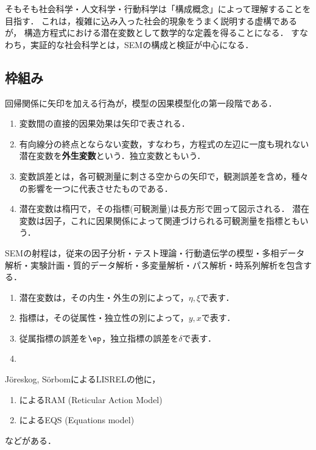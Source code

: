 \documentclass[uplatex,dvipdfmx]{jsreport}
\begin{document}
\begin{remarks}[抽象概念に数理的な定義を与える枠組みとしてのSEM]
    そもそも社会科学・人文科学・行動科学は「構成概念」によって理解することを目指す．
    これは，複雑に込み入った社会的現象をうまく説明する虚構であるが，
    構造方程式における潜在変数として数学的な定義を得ることになる．
    すなわち，実証的な社会科学とは，SEMの構成と検証が中心になる．
\end{remarks}

\subsection{枠組み}

\begin{definition}
    回帰関係に矢印を加える行為が，模型の因果模型化の第一段階である．
    \begin{enumerate}
        \item 変数間の直接的因果効果は矢印で表される．
        \item 有向線分の終点とならない変数，すなわち，方程式の左辺に一度も現れない潜在変数を\textbf{外生変数}という．独立変数ともいう．
        \item 変数誤差とは，各可観測量に刺さる空からの矢印で，観測誤差を含め，種々の影響を一つに代表させたものである．
        \item 潜在変数は楕円で，その指標(可観測量)は長方形で囲って図示される．
        潜在変数は因子，これに因果関係によって関連づけられる可観測量を指標ともいう．
    \end{enumerate}
\end{definition}
\begin{application}
    SEMの射程は，従来の因子分析・テスト理論・行動遺伝学の模型・多相データ解析・実験計画・質的データ解析・多変量解析・パス解析・時系列解析を包含する．
\end{application}
\begin{example}[LISRELでの変数の分類]\mbox{}
    \begin{enumerate}
        \item 潜在変数は，その内生・外生の別によって，$\eta,\xi$で表す．
        \item 指標は，その従属性・独立性の別によって，$y,x$で表す．
        \item 従属指標の誤差を$\ep$，独立指標の誤差を$\delta$で表す．
        \item 
    \end{enumerate}
\end{example}
\begin{example}
    Jöreskog, SörbomによるLISRELの他に，
    \begin{enumerate}
        \item \cite{McArdle-McDonald84}によるRAM (Reticular Action Model)
        \item \cite{Bentler-Weeks80}によるEQS (Equations model)
    \end{enumerate}
    などがある．
\end{example}
\end{document}
